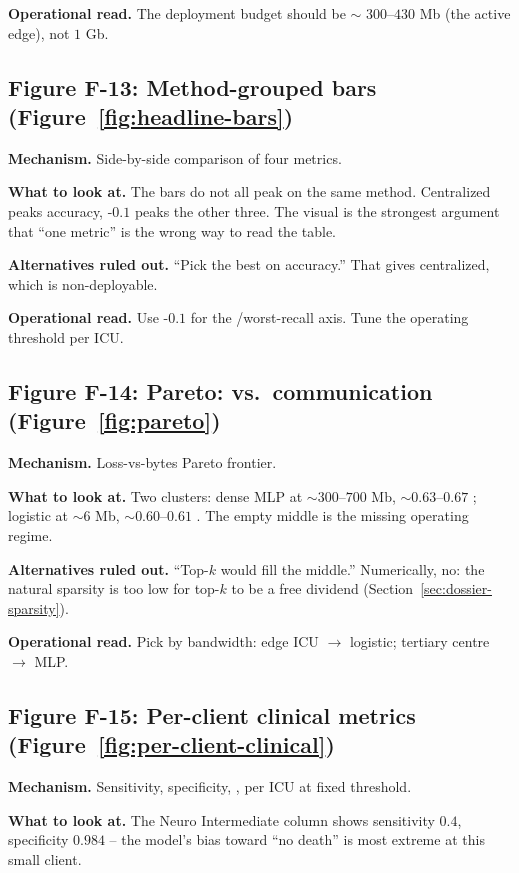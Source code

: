 \textbf{Operational read.} The deployment budget should be $\sim$
$300$--$430$ Mb (the active edge), not $1$ Gb.

\subsection{Figure F-13: Method-grouped bars
(Figure~\ref{fig:headline-bars})}
\textbf{Mechanism.} Side-by-side comparison of four metrics.

\textbf{What to look at.} The bars do not all peak on the same
method. Centralized peaks accuracy, \fedprox{}-$0.1$ peaks the
other three. The visual is the strongest argument that ``one
metric'' is the wrong way to read the table.

\textbf{Alternatives ruled out.} ``Pick the best on accuracy.''
That gives centralized, which is non-deployable.

\textbf{Operational read.} Use \fedprox{}-$0.1$ for the
\auprc{}/worst-recall axis. Tune the operating threshold per ICU.

\subsection{Figure F-14: Pareto: \auprc{} vs.\ communication
(Figure~\ref{fig:pareto})}
\textbf{Mechanism.} Loss-vs-bytes Pareto frontier.

\textbf{What to look at.} Two clusters: dense MLP at
$\sim$$300$--$700$ Mb, $\sim$$0.63$--$0.67$ \auprc{};
logistic at $\sim$$6$ Mb, $\sim$$0.60$--$0.61$ \auprc{}. The
empty middle is the missing operating regime.

\textbf{Alternatives ruled out.} ``Top-$k$ would fill the
middle.'' Numerically, no: the natural sparsity is too low for
top-$k$ to be a free dividend (Section~\ref{sec:dossier-sparsity}).

\textbf{Operational read.} Pick by bandwidth: edge ICU $\to$
logistic; tertiary centre $\to$ MLP.

\subsection{Figure F-15: Per-client clinical metrics
(Figure~\ref{fig:per-client-clinical})}
\textbf{Mechanism.} Sensitivity, specificity, \auroc{}, \auprc{}
per ICU at fixed threshold.

\textbf{What to look at.} The Neuro Intermediate column shows
sensitivity $0.4$, specificity $0.984$ -- the model's bias
toward ``no death'' is most extreme at this small client.

